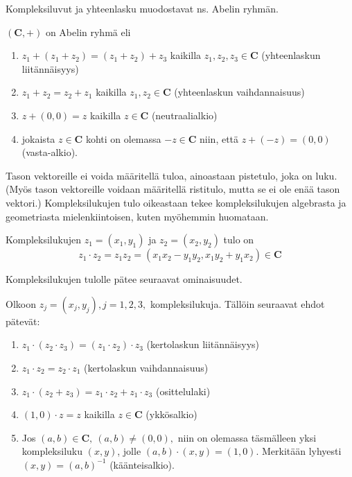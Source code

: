 \documentclass[a4paper, 12pt]{article}
\theoremstyle{remark}
\theoremstyle{definition}
\begin{document}
Kompleksiluvut ja yhteenlasku muodostavat ns. Abelin ryhmän.
\begin{lause} $(\mathbf{C}, +)$ on Abelin ryhmä eli
\begin{enumerate}[label=\roman*), leftmargin=*, topsep=0pt, itemsep=0pt, parsep=0pt, font=\small\bfseries\color{red}]
\item $z_1+(z_1+z_2)=(z_1+z_2)+z_3$ kaikilla $z_1, z_2, z_3\in\mathbf{C}$ (yhteenlaskun liitännäisyys)
\item $z_1+z_2=z_2+z_1$ kaikilla $z_1, z_2\in\mathbf{C}$ (yhteenlaskun vaihdannaisuus)
\item $z+(0,0)=z$ kaikilla $z\in\mathbf{C}$ (neutraalialkio)
\item jokaista $z\in\mathbf{C}$ kohti on olemassa $-z\in\mathbf{C}$ niin, että $z+(-z)=(0,0)$ (vasta-alkio).
\end{enumerate}

\end{lause}

Tason vektoreille ei voida määritellä tuloa, ainoastaan pistetulo, joka on luku. (Myös tason vektoreille voidaan määritellä ristitulo, mutta se ei ole enää tason vektori.) Kompleksilukujen tulo oikeastaan tekee kompleksilukujen algebrasta ja geometriasta mielenkiintoisen, kuten myöhemmin huomataan.

\begin{maar}
Kompleksilukujen $z_1=(x_1, y_1)$ ja $z_2=(x_2, y_2)$ tulo on
$$
z_1\cdot z_2=z_1 z_2=(x_1x_2-y_1y_2, x_1y_2+y_1x_2)\in\mathbf{C}
$$
\end{maar}

Kompleksilukujen tulolle pätee seuraavat ominaisuudet.
\begin{lause}
Olkoon $z_j=(x_j, y_j), j=1,2,3,$ kompleksilukuja. Tällöin seuraavat ehdot pätevät:
\begin{enumerate}[label=\roman*), leftmargin=*, topsep=0pt, itemsep=0pt, parsep=0pt, font=\small\bfseries\color{red}]
\item $z_1\cdot(z_2\cdot z_3)=(z_1\cdot z_2)\cdot z_3$ (kertolaskun liitännäisyys)
\item $z_1\cdot z_2=z_2\cdot z_1$ (kertolaskun vaihdannaisuus)
\item $z_1\cdot(z_2+z_3)=z_1\cdot z_2+z_1\cdot z_3$ (osittelulaki)
\item $(1,0)\cdot z=z$ kaikilla $z\in\mathbf{C}$ (ykkösalkio)
\item Jos $(a, b)\in\mathbf{C},\ (a, b)\neq (0,0),$ niin on olemassa täsmälleen yksi kompleksiluku $(x, y)$, jolle $(a, b)\cdot(x,y)=(1,0).$ Merkitään lyhyesti $(x, y)=(a, b)^{-1}$ (käänteisalkio).
\end{enumerate}
\end{lause}
\end{document}
